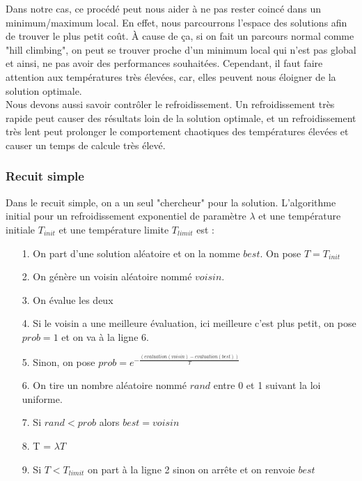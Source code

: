 \documentclass[11pt,french]{report}
\begin{document}
	Dans notre cas, ce procédé peut nous aider à ne pas rester coincé dans un minimum/maximum local. En effet, nous parcourrons l'espace des solutions afin de trouver le plus petit coût. À cause de ça, si on fait un parcours normal comme "hill climbing", on peut se trouver proche d'un minimum local qui n'est pas global et ainsi, ne pas avoir des performances souhaitées. Cependant, il faut faire attention aux températures très élevées, car, elles peuvent nous éloigner de la solution optimale.\\
	
	Nous devons aussi savoir contrôler le refroidissement. Un refroidissement très rapide peut causer des résultats loin de la solution optimale, et un refroidissement très lent peut prolonger le comportement chaotiques des températures élevées et causer un temps de calcule très élevé.
	
	\subsubsection{Recuit simple\label{recuit simple}}
	Dans le recuit simple, on a un seul "chercheur" pour la solution. 
	L'algorithme initial pour un refroidissement exponentiel de paramètre $\lambda$ et une température initiale $T_{init}$ et une température limite $T_{limit}$ est :\\
	
	\begin{itemize}
        \item[1.] On part d'une solution aléatoire et on la nomme $best$. On pose $T = T_{init}$
		\item[2.] On génère un voisin aléatoire nommé $voisin$.
		\item[3.] On évalue les deux
		\item[4.] Si le voisin a une meilleure évaluation, ici meilleure c'est plus petit, on pose $prob = 1$ et on va à la ligne 6.
		\item[5.] Sinon, on pose $prob = e^{-\frac{(evaluation(voisin) - evaluation(best))}{T}}$
		\item[6.] On tire un nombre aléatoire nommé $rand$ entre 0 et 1 suivant la loi uniforme.
		\item[7.] Si $rand < prob$ alors $best = voisin$
		\item[8.] T = $\lambda T$
		\item[9.] Si $T<T_{limit}$ on part à la ligne 2 sinon on arrête et on renvoie $best$\\
	\end{itemize}
\end{document}
